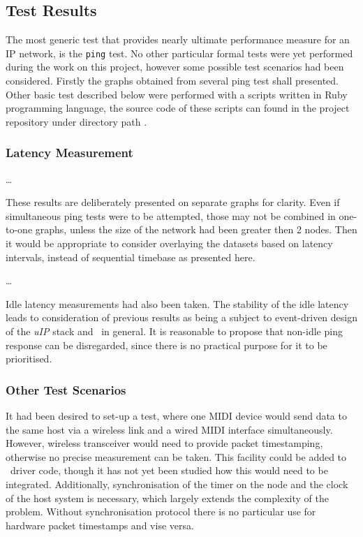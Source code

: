 \subsection{Test Results}

  The most generic test that provides nearly ultimate performance measure
 for an IP network, is the \texttt{ping} test. No other particular formal
 tests were yet performed during the work on this project, however some
 possible test scenarios had been considered. Firstly the graphs obtained
 from several ping test shall presented. Other basic test described below
 were performed with a scripts written in Ruby programming language, the
 source code of these scripts can found in the project repository under
 directory path .

\subsubsection{Latency Measurement}

  \dots

  These results are deliberately presented on separate graphs for clarity.
 Even if simultaneous ping tests were to be attempted, those may not be
 combined in one-to-one graphs, unless the size of the network had been
 greater then 2 nodes. Then it would be appropriate to consider overlaying
 the datasets based on latency intervals, instead of sequential timebase
 as presented here.

  \dots

  Idle latency measurements had also been taken. The stability of the idle
 latency leads to consideration of previous results as being a subject to
 event-driven design of the \emph{uIP} stack and \ContikiOS\ in general.
 It is reasonable to propose that non-idle ping response can be disregarded,
 since there is no practical purpose for it to be prioritised.

\subsubsection{Other Test Scenarios}

  It had been desired to set-up a test, where one MIDI device would send
 data to the same host via a wireless link and a wired MIDI interface
 simultaneously. However, wireless transceiver would need to provide packet
 timestamping, otherwise no precise measurement can be taken. This facility
 could be added to \MCX\ driver code, though it has not yet been studied
 how this would need to be integrated. Additionally, synchronisation of the
 timer on the node and the clock of the host system is necessary, which
 largely extends the complexity of the problem. Without synchronisation
 protocol there is no particular use for hardware packet timestamps and
 vise versa.


